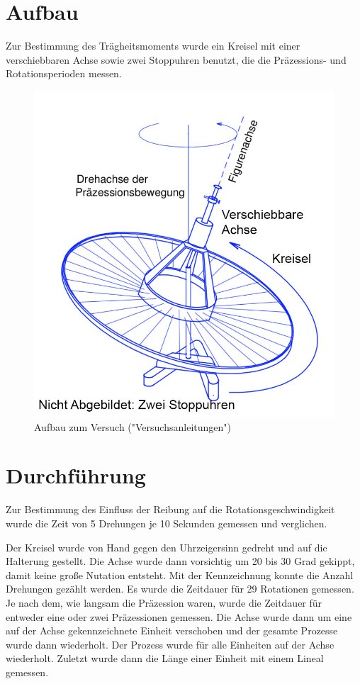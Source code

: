 \documentclass[11pt,a4paper]{article} %
\begin{document}
\section{Aufbau}
Zur Bestimmung des Trägheitsmoments wurde ein Kreisel mit einer verschiebbaren Achse sowie zwei Stoppuhren benutzt, die die Präzessions- und Rotationsperioden messen. 
\begin{figure}[h]
	\centering
	\includegraphics[scale=0.5]{Abb}
	\caption{Aufbau zum Versuch ("Versuchsanleitungen")}
\end{figure}

\section{Durchführung}
Zur Bestimmung des Einfluss der Reibung auf die Rotationsgeschwindigkeit wurde die Zeit von 5 Drehungen je 10 Sekunden gemessen und verglichen. 

Der Kreisel wurde von Hand gegen den Uhrzeigersinn gedreht und auf die Halterung gestellt. Die Achse wurde dann vorsichtig um 20 bis 30 Grad gekippt, damit keine große Nutation entsteht. Mit der Kennzeichnung konnte die Anzahl Drehungen gezählt werden. Es wurde die Zeitdauer für 29 Rotationen gemessen. Je nach dem, wie langsam die Präzession waren, wurde die Zeitdauer für entweder eine oder zwei Präzessionen gemessen. Die Achse wurde dann um eine auf der Achse gekennzeichnete Einheit verschoben und der gesamte Prozesse wurde dann wiederholt. Der Prozess wurde für alle Einheiten auf der Achse wiederholt. Zuletzt wurde dann die Länge einer Einheit mit einem Lineal gemessen. 
\end{document}
